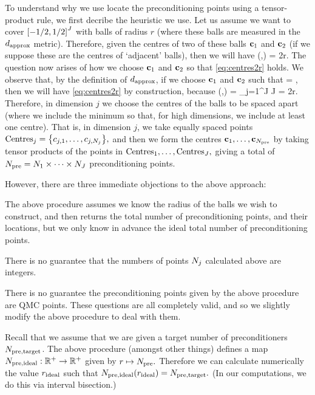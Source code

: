 To understand why we use locate the preconditioning points using a tensor-product rule, we first decribe the heuristic we use. Let us assume we want to cover $\cube{J}$ with balls of radius $r$ (where these balls are measured in the $d_{\mathrm{approx}}$ metric). Therefore, given the centres of two of these balls $\mathbf{c}_{1}$ and $\mathbf{c}_{2}$ (if we suppose these are the centres of `adjacent' balls), then we will have
\beq\label{eq:centres2r}
\dapprox(\bcone,\bct) = 2r.
\eeq
The question now arises of how we choose $\mathbf{c}_{1}$ and $\mathbf{c}_{2}$ so that \cref{eq:centres2r} holds. We observe that, by the definition of $d_{\mathrm{approx}}$, if we choose $\mathbf{c}_{1}$ and $\mathbf{c}_{2}$ such that
\beqs
\sqrt{\lambdaj} = ,
\eeqs
then we will have \cref{eq:centres2r} by construction, because
\beqs
\dapprox(\bcone,\bct) = \sum_{j=1}^J J = 2r.
\eeqs
Therefore, in dimension $j$ we choose the centres of the balls to be spaced
\beqs
\min{}
\eeqs
apart (where we include the minimum so that, for high dimensions, we include at least one centre). That is, in dimension $j$, we take
\beqs
\Nj \de \max{}
\eeqs
equally spaced points $\centresj = \set{c_{j,1},\ldots,c_{j,\Nj}},$ and then we form the centres $\mathbf{c}_{1},\ldots,\mathbf{c}_{N_{\mathrm{pre}}}$ by taking tensor products of the points in $\mathrm{Centres}_{1},\ldots,\mathrm{Centres}_{J},$ giving a total of $N_{\mathrm{pre}} = N_{1} \times \cdots \times N_{J}$ preconditioning points.

However, there are three immediate objections to the above approach:
\ben
\item The above procedure assumes we know the radius of the balls we wish to construct, and then returns the total number of preconditioning points, and their locations, but we only know in advance the ideal total number of preconditioning points.
\item There is no guarantee that the numbers of points $N_{j}$ calculated above are integers.
  \item There is no guarantee the preconditioning points given by the above procedure are QMC points.
    \een
    These questions are all completely valid, and so we slightly modify the above procedure to deal with them.

    Recall that we assume that we are given a target number of preconditioners $N_{\mathrm{pre,target}}$. The above procedure (amongst other things) defines a map $N_{\mathrm{pre,ideal}}:\mathbb R^{+} \rightarrow \mathbb R^{+}$ given by $r \mapsto N_{\mathrm{pre}}.$ Therefore we can calculate numerically the value $r_{\mathrm{ideal}}$ such that $N_{\mathrm{pre,ideal}}(r_{\mathrm{ideal}}) = N_{\mathrm{pre,target}}.$ (In our computations, we do this via interval bisection.)

